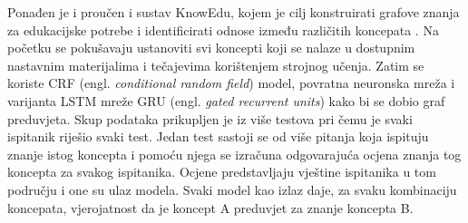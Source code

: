 \newline
\newline
Ponađen je i proučen i sustav KnowEdu, kojem je cilj konstruirati grafove znanja za edukacijske potrebe i identificirati odnose između različitih koncepata \citep{knwedu}.\newline
Na početku se pokušavaju ustanoviti svi koncepti koji se nalaze u dostupnim nastavnim materijalima i tečajevima korištenjem strojnog učenja. Zatim se koriste CRF (engl. \textit{conditional random field}) model, povratna neuronska mreža i varijanta LSTM mreže GRU (engl. \textit{gated recurrent units}) kako bi se dobio graf preduvjeta. Skup podataka prikupljen je iz više testova pri čemu je svaki ispitanik riješio svaki test. Jedan test sastoji se od više pitanja koja ispituju znanje istog koncepta i pomoću njega se izračuna odgovarajuća ocjena znanja tog koncepta za svakog ispitanika. Ocjene predstavljaju vještine ispitanika u tom području i one su ulaz modela. Svaki model kao izlaz daje, za svaku kombinaciju koncepata, vjerojatnost da je koncept A preduvjet za znanje koncepta B.